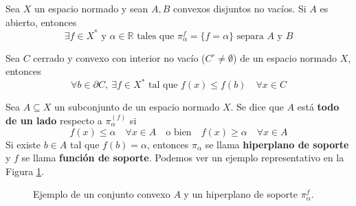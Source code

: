 \documentclass[12pt]{book}
\newcommand{\tbf}{\textbf}
\begin{document}
\begin{teo}\label{teo:hahn-banach-geometrico}
    Sea $X$ un espacio normado y sean $A, B$ convexos disjuntos no vacíos. Si $A$ es abierto, entonces 
    \begin{equation*}
        \exists f \in X^* \text{ y } \alpha \in \mathbb{R} \text{ tales que } \pi_\alpha^f = \{ f = \alpha \} \text{ separa } A \text{ y } B
    \end{equation*}
\end{teo}

\begin{coro}
    Sea $C$ cerrado y convexo con interior no vacío ($C^\circ \neq \emptyset$) de un espacio normado $X$, entonces 
    \begin{equation*}
        \forall b \in \partial C, \ \exists f \in X^* \text{ tal que } f(x) \leq f(b) \quad \forall x \in C
    \end{equation*}
\end{coro}

\begin{definicion}
    Sea $A \subseteq X$ un subconjunto de un espacio normado $X$. Se dice que $A$ está \tbf{todo de un lado} respecto a $\pi_\alpha^{(f)}$ si
    \begin{equation*}
        f(x) \leq \alpha \quad \forall x \in A \quad \text{o bien} \quad f(x) \geq \alpha \quad \forall x \in A
    \end{equation*}
    Si existe $b \in A$ tal que $f(b) = \alpha$, entonces $\pi_\alpha$ se llama \textbf{hiperplano de soporte} y $f$ se llama \textbf{función de soporte}. Podemos ver un ejemplo representativo en la Figura \ref{fig:hiperplano-soporte}.
\end{definicion}


\begin{figure}
    \centering
    \caption{Ejemplo de un conjunto convexo $A$ y un hiperplano de soporte $\pi_\alpha^f$.}
    \label{fig:hiperplano-soporte}
\end{figure}
\end{document}
